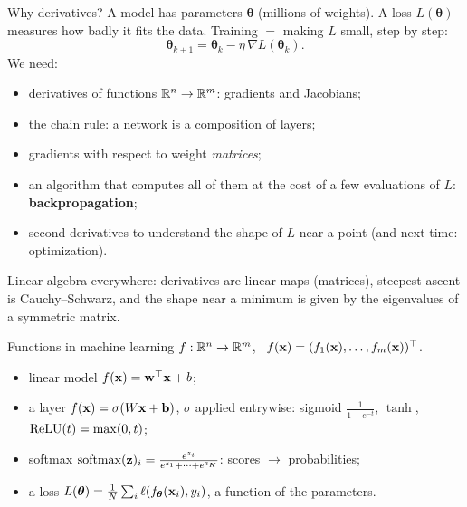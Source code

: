\documentclass[aspectratio=1610,11pt]{beamer}
\begin{document}
\begin{frame}{Why derivatives?}
    \small
    A model has parameters $\boldsymbol{\theta}$ (millions of weights). A loss $L(\boldsymbol{\theta})$ measures how badly it fits the data. Training $=$ making $L$ small, step by step:
    \[\boldsymbol{\theta}_{k+1} = \boldsymbol{\theta}_k - \eta\,\nabla L(\boldsymbol{\theta}_k).\]
    We need:
    \begin{itemize}
        \item derivatives of functions $\mathbb{R}^n \to \mathbb{R}^m$: gradients and Jacobians;
        \item the chain rule: a network is a composition of layers;
        \item gradients with respect to weight \emph{matrices};
        \item an algorithm that computes all of them at the cost of a few evaluations of $L$: \textbf{backpropagation};
        \item second derivatives to understand the shape of $L$ near a point (and next time: optimization).
    \end{itemize}
    Linear algebra everywhere: derivatives are linear maps (matrices), steepest ascent is Cauchy--Schwarz, and the shape near a minimum is given by the eigenvalues of a symmetric matrix.
\end{frame}


\begin{frame}{Functions in machine learning}
    \small
    $f: \mathbb{R}^n \to \mathbb{R}^m$, \ $f(\mathbf{x}) = (f_1(\mathbf{x}), \ldots, f_m(\mathbf{x}))^\top$.
    \begin{example}[][ex:ml-functions]
        \small
        \begin{itemize}
            \item linear model $f(\mathbf{x}) = \mathbf{w}^\top\mathbf{x} + b$;
            \item a layer $f(\mathbf{x}) = \sigma(W\mathbf{x} + \mathbf{b})$, $\sigma$ applied entrywise: sigmoid $\frac{1}{1 + e^{-t}}$, $\tanh$, $\operatorname{ReLU}(t) = \max(0, t)$;
            \item softmax $\operatorname{softmax}(\mathbf{z})_i = \frac{e^{z_i}}{e^{z_1} + \cdots + e^{z_K}}$: scores $\to$ probabilities;
            \item a loss $L(\boldsymbol{\theta}) = \frac{1}{N}\sum_i \ell(f_{\boldsymbol{\theta}}(\mathbf{x}_i), y_i)$, a function of the parameters.
        \end{itemize}
    \end{example}
    \centering{}
\end{frame}
\end{document}
